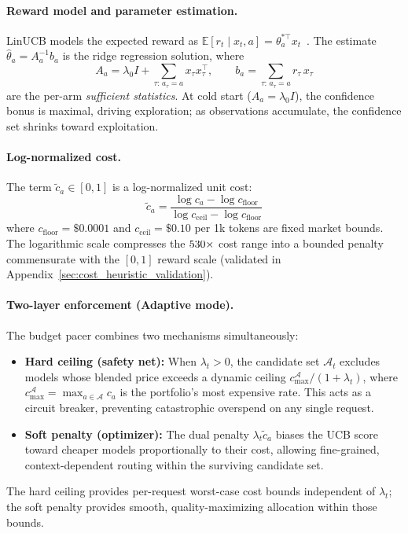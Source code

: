 \paragraph{Reward model and parameter estimation.}
LinUCB models the expected reward as $\mathbb{E}[r_t \mid x_t, a] = \theta_a^{*\top} x_t$~\cite{li2010contextual}. The estimate $\hat\theta_a = A_a^{-1} b_a$ is the ridge regression solution, where
\begin{equation}
    A_a = \lambda_0 I + \textstyle\sum_{\tau:\, a_\tau = a} x_\tau x_\tau^\top, \qquad
    b_a = \textstyle\sum_{\tau:\, a_\tau = a} r_\tau\, x_\tau
    \label{eq:sufficient_stats}
\end{equation}
are the per-arm \emph{sufficient statistics}. At cold start ($A_a = \lambda_0 I$), the confidence bonus is maximal, driving exploration; as observations accumulate, the confidence set shrinks toward exploitation.

\paragraph{Log-normalized cost.}
The term $\tilde{c}_a \in [0,1]$ is a log-normalized unit cost:
\begin{equation}
    \tilde{c}_a = \frac{\log c_a - \log c_{\mathrm{floor}}}{\log c_{\mathrm{ceil}} - \log c_{\mathrm{floor}}}
    \label{eq:cost_norm}
\end{equation}
where $c_{\mathrm{floor}}{=}\$0.0001$ and $c_{\mathrm{ceil}}{=}\$0.10$ per 1k tokens are fixed market bounds. The logarithmic scale compresses the $530{\times}$ cost range into a bounded penalty commensurate with the $[0,1]$ reward scale (validated in Appendix~\ref{sec:cost_heuristic_validation}).

\paragraph{Two-layer enforcement (Adaptive mode).}
The budget pacer combines two mechanisms simultaneously:
\begin{itemize}[nosep,leftmargin=*]
  \item \textbf{Hard ceiling (safety net):} When $\lambda_t > 0$, the candidate set $\mathcal{A}_t$ excludes models whose blended price exceeds a dynamic ceiling $c_{\max}^{\mathcal{A}} / (1 + \lambda_t)$, where $c_{\max}^{\mathcal{A}} = \max_{a \in \mathcal{A}} c_a$ is the portfolio's most expensive rate. This acts as a circuit breaker, preventing catastrophic overspend on any single request.
  \item \textbf{Soft penalty (optimizer):} The dual penalty $\lambda_t \tilde{c}_a$ biases the UCB score toward cheaper models proportionally to their cost, allowing fine-grained, context-dependent routing within the surviving candidate set.
\end{itemize}
The hard ceiling provides per-request worst-case cost bounds independent of $\lambda_t$; the soft penalty provides smooth, quality-maximizing allocation within those bounds.

